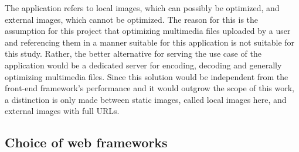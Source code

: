 \documentclass[a4paper, 12pt]{article}
\begin{document}
The application refers to local images, which can possibly be optimized, and external images, which cannot be optimized.
The reason for this is the assumption for this project that optimizing multimedia files uploaded by a user and referencing them in a manner suitable for this application is not suitable for this study.
Rather, the better alternative for serving the use case of the application would be a dedicated server for encoding, decoding and generally optimizing multimedia files.
Since this solution would be independent from the front-end framework's performance and it would outgrow the scope of this work, a distinction is only made between static images, called local images here, and external images with full URLs.

\subsection{Choice of web frameworks}

\end{document}
